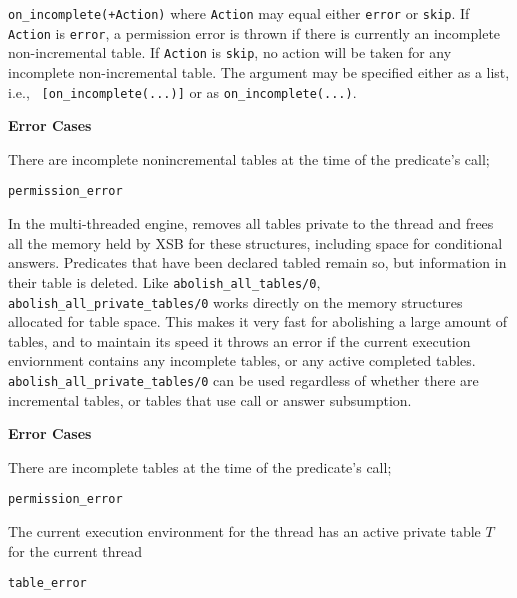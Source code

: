 \begin{description}
\begin{description}
{\bi
\item {\tt on\_incomplete(+Action)} where {\tt Action} may equal
  either {\tt error} or {\tt skip}.  If {\tt Action} is {\tt error}, a
  permission error is thrown if there is currently an incomplete
  non-incremental table.  If {\tt Action} is {\tt skip}, no action
  will be taken for any incomplete non-incremental table.  
\ei 
%
The argument may be specified either as a list, i.e., {\tt
  [on\_incomplete(...)]} or as {\tt on\_incomplete(...)}.
}

{\bf Error Cases}
\bi
\item There are incomplete nonincremental tables at the time of the predicate's call;
\bi
\item 	{\tt permission\_error}
\ei
\ei


%
In the multi-threaded engine, removes all tables private to the thread
and frees all the memory held by XSB for these structures, including
space for conditional answers.  Predicates that have been declared
tabled remain so, but information in their table is deleted.  Like
{\tt abolish\_all\_tables/0}, {\tt abolish\_all\_private\_tables/0}
works directly on the memory structures allocated for table space.
This makes it very fast for abolishing a large amount of tables, and
to maintain its speed it throws an error if the current execution
enviornment contains any incomplete tables, or any active completed
tables.  {\tt abolish\_all\_private\_tables/0} can be used regardless of
whether there are incremental tables, or tables that use call or
answer subsumption.


{\bf Error Cases}
\bi
\item There are incomplete tables at the time of the predicate's call;
\bi
\item 	{\tt permission\_error}
\ei
\item The current execution environment for the thread has an active
  private table $T$ for the current thread
\bi
\item 	{\tt table\_error}
\ei
%
\ei



\end{description}
\end{description}
